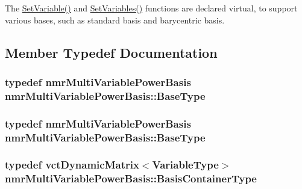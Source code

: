 The \hyperlink{classnmr_multi_variable_power_basis_a6725bd03e0272877f0737187345aab6d}{Set\+Variable()} and \hyperlink{classnmr_multi_variable_power_basis_a250029c052022602969689861c94a5c2}{Set\+Variables()} functions are declared virtual, to support various bases, such as standard basis and barycentric basis. 

\subsection{Member Typedef Documentation}
\hypertarget{classnmr_multi_variable_power_basis_aaf11c12fba7357db886d9eee2fc480b4}{}
\subsubsection[{Base\+Type}]{\setlength{\rightskip}{0pt plus 5cm}typedef {\bf nmr\+Multi\+Variable\+Power\+Basis} {\bf nmr\+Multi\+Variable\+Power\+Basis\+::\+Base\+Type}}\label{classnmr_multi_variable_power_basis_aaf11c12fba7357db886d9eee2fc480b4}
\hypertarget{classnmr_multi_variable_power_basis_aaf11c12fba7357db886d9eee2fc480b4}{}
\subsubsection[{Base\+Type}]{\setlength{\rightskip}{0pt plus 5cm}typedef {\bf nmr\+Multi\+Variable\+Power\+Basis} {\bf nmr\+Multi\+Variable\+Power\+Basis\+::\+Base\+Type}}\label{classnmr_multi_variable_power_basis_aaf11c12fba7357db886d9eee2fc480b4}
\hypertarget{classnmr_multi_variable_power_basis_ac85dc969184c15d34dd849c4cbd04180}{}
\subsubsection[{Basis\+Container\+Type}]{\setlength{\rightskip}{0pt plus 5cm}typedef {\bf vct\+Dynamic\+Matrix}$<${\bf Variable\+Type}$>$ {\bf nmr\+Multi\+Variable\+Power\+Basis\+::\+Basis\+Container\+Type}\hspace{0.3cm}{\ttfamily [protected]}}\label{classnmr_multi_variable_power_basis_ac85dc969184c15d34dd849c4cbd04180}
\hypertarget{classnmr_multi_variable_power_basis_a2cb67df83e9fcac213848fa7a7295fcc}{}
